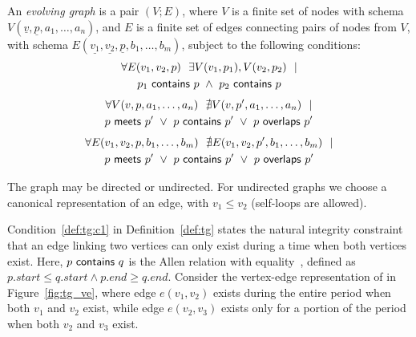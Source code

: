 \begin{definition}[TGraph]
An {\em evolving graph} \tg is a pair $(V; E)$, where $V$ is a finite
set of nodes with schema $V(\underline{v}, \underline{p}, a_1,
\ldots, a_n)$, and $E$ is a finite set of edges connecting pairs of
nodes from $V$, with schema $E(\underline{v_1}, \underline{v_2},
\underline{p}, b_1, \ldots, b_m)$, subject to the following
conditions:
\begin{multline}
\forall E(v_1, v_2, p)~~\exists V(v_1, p_1), V(v_2, p_2)~~| \\
                       p_1~\mathsf{contains}~p~\wedge~p_2~\mathsf{contains}~p
\label{def:tg:c1}
\end{multline}
\vspace{-0.5cm}
\begin{multline}
\forall V(v, p, a_1, \ldots, a_n)~~\nexists V(v, p', a_1, \ldots, a_n)~~| \\
                       p~\mathsf{meets}~p'~\lor~p~\mathsf{contains}~p'~\lor~p~\mathsf{overlaps}~p'
\label{def:tg:c2}
\end{multline}
\vspace{-0.5cm}
\begin{multline}
\forall E(v_1, v_2, p,  b_1, \ldots, b_m)~~\nexists E(v_1,v_2, p', b_1, \ldots, b_m)~~| \\
                       p~\mathsf{meets}~p'~\lor~p~\mathsf{contains}~p'~\lor~p~\mathsf{overlaps}~p'
\label{def:tg:c3}
\end{multline}
\vspace{-0.5cm}
\label{def:tg}
\end{definition}

The graph may be directed or undirected.  For undirected graphs we
choose a canonical representation of an edge, with $v_1 \leq v_2$
(self-loops are allowed).

Condition~\ref{def:tg:c1} in Definition~\ref{def:tg} states the
natural integrity constraint that an edge linking two vertices can
only exist during a time when both vertices exist.  Here,
$p~\mathsf{contains}~q$ is the Allen  relation with
equality~\cite{allen83}, defined as $p.start \leq q.start \wedge p.end
\geq q.end$.  Consider the vertex-edge representation of \tg
{} in Figure~\ref{fig:tg_ve}, where edge $e(v_1,v_2)$ exists
during the entire period when both $v_1$ and $v_2$ exist, while edge
$e(v_2,v_3)$ exists only for a portion of the period when both $v_2$
and $v_3$ exist.

